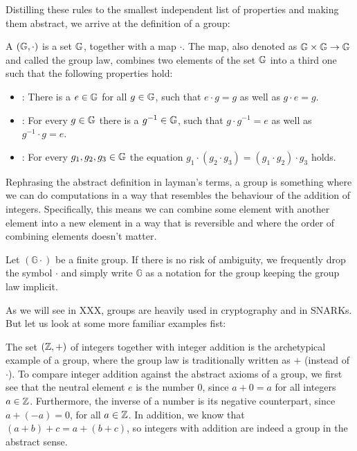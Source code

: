 Distilling these rules to the smallest independent list of properties and making them abstract, we arrive at the definition of a group:

A  $(\mathbb{G},\cdot) $ is a set $ \mathbb{G}$, together with a map $ \cdot$. The map, also denoted as $\mathbb{G} \times \mathbb{G} \to \mathbb{G} $ and called the group law, combines two elements of the set $ \mathbb{G}$ into a third one such that the following properties hold:
\begin{itemize}
\item {}: There is a $e\in\mathbb{G}$ for all $g\in\mathbb{G}$, such that $e\cdot g=g$ as well as $g\cdot e = g$.
\item {}: For every $g\in\mathbb{G}$ there is a $g^{-1}\in\mathbb{G}$, such that $g\cdot g^{-1}=e$ as well as $g^{-1}\cdot g = e$.
\item {}: For every $g_1,g_2,g_3\in\mathbb{G}$ the equation
$g_1\cdot(g_2\cdot g_3) = (g_1\cdot g_2)\cdot g_3$ holds.
\end{itemize}
Rephrasing the abstract definition in layman's terms, a group is something where we can do computations in a way that resembles the behaviour of the addition of integers. Specifically, this means we can combine some element with another element into a new element in a way that is reversible and where the order of combining elements doesn't matter.
\begin{notation}
Let $(\mathbb{G}\cdot)$ be a finite group. If there is no risk of ambiguity, we frequently drop the symbol $\cdot$ and simply write $\mathbb{G}$ as a notation for the group keeping the group law implicit.
\end{notation}
As we will see in XXX, groups are heavily used in cryptography and in SNARKs. But let us look at some more familiar examples fist:
\begin{example}
The set $(\mathbb{Z},+)$ of integers together with integer addition is the archetypical example of a group, where the group law is traditionally written as $+$ (instead of $\cdot$). To compare integer addition against the abstract axioms of a group, we first see that the neutral element $e$ is the number $0$, since $a+0=a$ for all integers $a\in \mathbb{Z}$. Furthermore, the inverse of a number is its negative counterpart, since $a+(-a)=0$, for all $a\in\mathbb{Z}$. In addition, we know that $(a+b)+c=a+(b+c)$, so integers with addition are indeed a group in the abstract sense.
\end{example}
